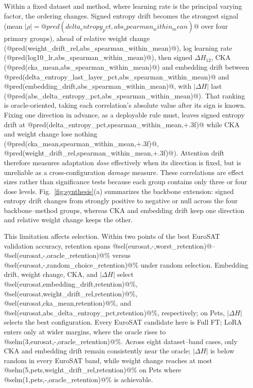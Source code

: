 \documentclass[conference]{IEEEtran}
\begin{document}
Within a fixed dataset and method, where learning rate is the principal varying factor, the ordering changes. Signed entropy drift becomes the strongest signal (mean $|\rho|=@pred(delta_entropy_pct,abs_spearman_within_mean)@$ over four primary groups), ahead of relative weight change (@pred(weight_drift_rel,abs_spearman_within_mean)@), log learning rate (@pred(log10_lr,abs_spearman_within_mean)@), then signed $\Delta H_{12}$, CKA (@pred(cka_mean,abs_spearman_within_mean)@) and embedding drift between @pred(delta_entropy_last_layer_pct,abs_spearman_within_mean)@ and @pred(embedding_drift,abs_spearman_within_mean)@, with $|\Delta H|$ last (@pred(abs_delta_entropy_pct,abs_spearman_within_mean)@). That ranking is oracle-oriented, taking each correlation's absolute value after its sign is known. Fixing one direction in advance, as a deployable rule must, leaves signed entropy drift at @pred(delta_entropy_pct,spearman_within_mean,+.3f)@ while CKA and weight change lose nothing (@pred(cka_mean,spearman_within_mean,+.3f)@, @pred(weight_drift_rel,spearman_within_mean,+.3f)@). Attention drift therefore measures adaptation \emph{dose} effectively when its direction is fixed, but is unreliable as a cross-configuration \emph{damage} measure. These correlations are effect sizes rather than significance tests because each group contains only three or four dose levels. Fig.~\ref{fig:synthesis}(a) summarizes the backbone extension: signed entropy drift changes from strongly positive to negative or null across the four backbone--method groups, whereas CKA and embedding drift keep one direction and relative weight change keeps the other.

This limitation affects selection. Within two points of the best EuroSAT validation accuracy, retention spans @sel(eurosat,-,worst_retention)@--@sel(eurosat,-,oracle_retention)@\% versus @sel(eurosat,-,random_choice_retention)@\% under random selection. Embedding drift, weight change, CKA, and $|\Delta H|$ select @sel(eurosat,embedding_drift,retention)@\%, @sel(eurosat,weight_drift_rel,retention)@\%, @sel(eurosat,cka_mean,retention)@\%, and @sel(eurosat,abs_delta_entropy_pct,retention)@\%, respectively; on Pets, $|\Delta H|$ selects the best configuration. Every EuroSAT candidate here is Full FT; LoRA enters only at wider margins, where the oracle rises to @selm(3,eurosat,-,oracle_retention)@\%. Across eight dataset--band cases, only CKA and embedding drift remain consistently near the oracle; $|\Delta H|$ is below random in every EuroSAT band, while weight change reaches at most @selm(5,pets,weight_drift_rel,retention)@\% on Pets where @selm(1,pets,-,oracle_retention)@\% is achievable.
\end{document}
